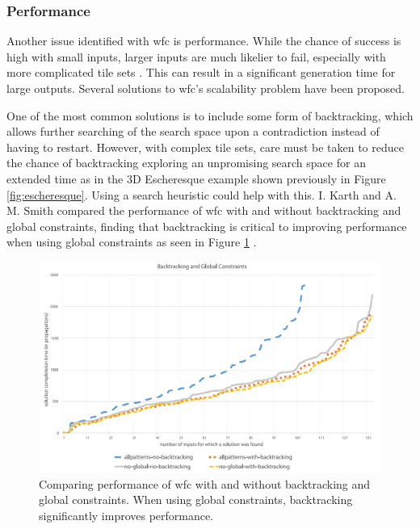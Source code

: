
\subsubsection{Performance}\label{sec:performance}
Another issue identified with \acrshort{wfc} is performance. While the chance of success is high with small inputs, larger inputs are much likelier to fail, especially with more complicated tile sets \cite{WFC_ConstraintSolving_and_ML}. This can result in a significant generation time for large outputs. Several solutions to \acrshort{wfc}'s scalability problem have been proposed.%

One of the most common solutions is to include some form of backtracking, which allows further searching of the search space upon a contradiction instead of having to restart. However, with complex tile sets, care must be taken to reduce the chance of backtracking exploring an unpromising search space for an extended time as in the 3D Escheresque example shown previously in Figure \ref{fig:escheresque}. Using a search heuristic could help with this. I. Karth and A. M. Smith compared the performance of \acrshort{wfc} with and without backtracking and global constraints, finding that backtracking is critical to improving performance when using global constraints as seen in Figure \ref{fig:backtrackingPerformance} \cite{WFC_ConstraintSolving_and_ML}.

\begin{figure}[H]
    \centering
    \includegraphics[width=\textwidth, height=0.3\textheight, keepaspectratio]{Images/BacktrackingPerformance.png}
    \caption{Comparing performance of \acrshort{wfc} with and without backtracking and global constraints. When using global constraints, backtracking significantly improves performance. \cite{WFC_ConstraintSolving_and_ML}}
    \label{fig:backtrackingPerformance}
\end{figure}

